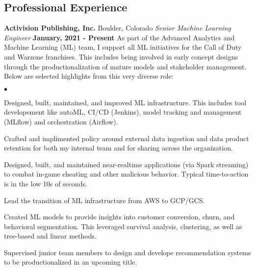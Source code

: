 \documentclass[margin,line, 11pt]{res}
\newenvironment{list2}{
  \begin{list}{$\bullet$}{%
      \setlength{\itemsep}{0in}
      \setlength{\parsep}{0in} \setlength{\parskip}{0in}
      \setlength{\topsep}{0in} \setlength{\partopsep}{0in}
      \setlength{\leftmargin}{0.2in}}}{\end{list}}
\begin{document}
\begin{resume}
\section{Professional \newline Experience}
\textbf{Activision Publishing, Inc.} \hfill Boulder, Colorado\newline
\textit{Senior Machine Learning Engineer} \hfill \textbf{January, 2021 - Present}\newline
As part of the Advanced Analytics and Machine Learning (ML) team, I support all ML initiatives for the Call of Duty and Warzone franchises. This includes being involved in early concept designs through the productionalization of mature models and stakeholder management. Below are selected highlights from this very diverse role:
    \begin{list2}
      \item Designed, built, maintained, and improved ML infrastructure. This includes tool developement like autoML, CI/CD (Jenkins), model tracking and management (MLflow) and orchestration (Airflow).
      \item Crafted and implimented policy around external data ingestion and data product retention for both my internal team and for sharing across the organization.
      \item Designed, built, and maintained near-realtime applications (via Spark streaming) to combat in-game cheating and other malicious behavior. Typical time-to-action is in the low 10s of seconds.
      \item Lead the transition of ML infrastructure from AWS to GCP/GCS.
      \item Created ML models to provide insights into customer conversion, churn, and behavioral segmentation. This leveraged survival analysis, clustering, as well as tree-based and linear methods.
      \item Supervised junior team members to design and develope recommendation systems to be productionalized in an upcoming title. 
    \end{list2}
\vspace*{-2mm}


\end{resume}
\end{document}
